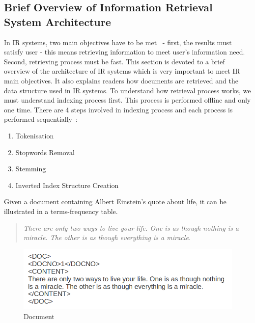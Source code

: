 \subsection{Brief Overview of Information Retrieval System Architecture}\label{section:IRarchitecture}
In IR systems, two main objectives have to be met~\cite{IRarchitecture} - first, the results must satisfy user - this means retrieving information to meet user's
information need. Second, retrieving process must be fast. This section is devoted to a brief overview of the architecture of IR systems 
which is very important to meet IR main objectives. It also explains readers
how documents are retrieved and the data structure used in IR systems. To understand how retrieval process works, we must understand 
indexing process first. This process is performed offline and only one time. 
There are 4 steps involved in indexing process and each process is performed sequentially~\cite{IRarchitecture}:
\begin{enumerate}
 \item Tokenisation
 \item Stopwords Removal
 \item Stemming
 \item Inverted Index Structure Creation
\end{enumerate}

Given a document containing Albert Einstein's quote about life, it can be illustrated in a terms-frequency table.

\begin{quotation}
 \item \textit{There are only two ways to live your life. One is as though nothing is a miracle. The other is as though everything is a miracle.}
\end{quotation}


\begin{figure}
\centering
\includegraphics[scale=0.5]{./figures/text.png}
\caption{Document} \label{fig:quote} 
\end{figure}

